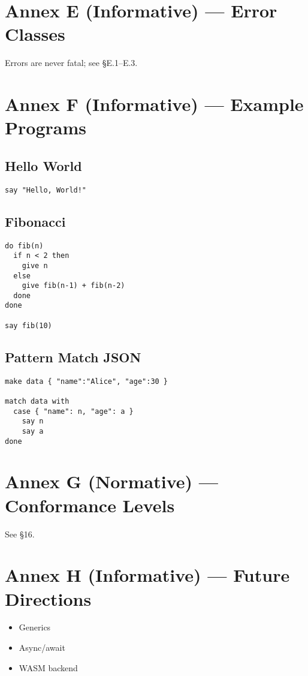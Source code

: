 \documentclass[12pt,a4paper]{article}
\begin{document}
\section{Annex E (Informative) --- Error Classes}
Errors are never fatal; see §E.1–E.3.

\section{Annex F (Informative) --- Example Programs}
\subsection*{Hello World}
\begin{lstlisting}
say "Hello, World!"
\end{lstlisting}

\subsection*{Fibonacci}
\begin{lstlisting}
do fib(n)
  if n < 2 then
    give n
  else
    give fib(n-1) + fib(n-2)
  done
done

say fib(10)
\end{lstlisting}

\subsection*{Pattern Match JSON}
\begin{lstlisting}
make data { "name":"Alice", "age":30 }

match data with
  case { "name": n, "age": a }
    say n
    say a
done
\end{lstlisting}

\section{Annex G (Normative) --- Conformance Levels}
See §16.

\section{Annex H (Informative) --- Future Directions}
\begin{itemize}
\item Generics
\item Async/await
\item WASM backend
\end{itemize}

\end{document}
